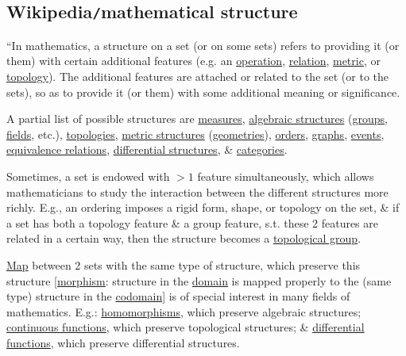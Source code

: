 \documentclass{article}
\begin{document}
\subsection{Wikipedia{\tt/}mathematical structure}
``In mathematics, a structure on a set (or on some sets) refers to providing it (or them) with certain additional features (e.g. an \href{https://en.wikipedia.org/wiki/Operation_(mathematics)}{operation}, \href{https://en.wikipedia.org/wiki/Relation_(mathematics)}{relation}, \href{https://en.wikipedia.org/wiki/Metric_(mathematics)}{metric}, or \href{https://en.wikipedia.org/wiki/Topological_space}{topology}). The additional features are attached or related to the set (or to the sets), so as to provide it (or them) with some additional meaning or significance.

A partial list of possible structures are \href{https://en.wikipedia.org/wiki/Measure_theory}{measures}, \href{https://en.wikipedia.org/wiki/Algebraic_structure}{algebraic structures} (\href{https://en.wikipedia.org/wiki/Group_(mathematics)}{groups}, \href{https://en.wikipedia.org/wiki/Field_(mathematics)}{fields}, etc.), \href{https://en.wikipedia.org/wiki/Topology}{topologies}, \href{https://en.wikipedia.org/wiki/Metric_space}{metric structures} (\href{https://en.wikipedia.org/wiki/Geometry}{geometries}), \href{https://en.wikipedia.org/wiki/Order_theory}{orders}, \href{https://en.wikipedia.org/wiki/Graph_theory}{graphs}, \href{https://en.wikipedia.org/wiki/Event_structure}{events}, \href{https://en.wikipedia.org/wiki/Equivalence_relation}{equivalence relations}, \href{https://en.wikipedia.org/wiki/Differential_structure}{differential structures}, \& \href{https://en.wikipedia.org/wiki/Category_(mathematics)}{categories}.

Sometimes, a set is endowed with $> 1$ feature simultaneously, which allows mathematicians to study the interaction between the different structures more richly. E.g., an ordering imposes a rigid form, shape, or topology on the set, \& if a set has both a topology feature \& a group feature, s.t. these 2 features are related in a certain way, then the structure becomes a \href{https://en.wikipedia.org/wiki/Topological_group}{topological group}.

\href{https://en.wikipedia.org/wiki/Map_(mathematics)}{Map} between 2 sets with the same type of structure, which preserve this structure [\href{https://en.wikipedia.org/wiki/Morphism}{morphism}: structure in the \href{https://en.wikipedia.org/wiki/Domain_of_a_function}{domain} is mapped properly to the (same type) structure in the \href{https://en.wikipedia.org/wiki/Codomain}{codomain}] is of special interest in many fields of mathematics. E.g.: \href{https://en.wikipedia.org/wiki/Homomorphisms}{homomorphisms}, which preserve algebraic structures; \href{https://en.wikipedia.org/wiki/Continuous_functions}{continuous functions}, which preserve topological structures; \& \href{https://en.wikipedia.org/wiki/Differentiable_functions}{differential functions}, which preserve differential structures.
\end{document}

